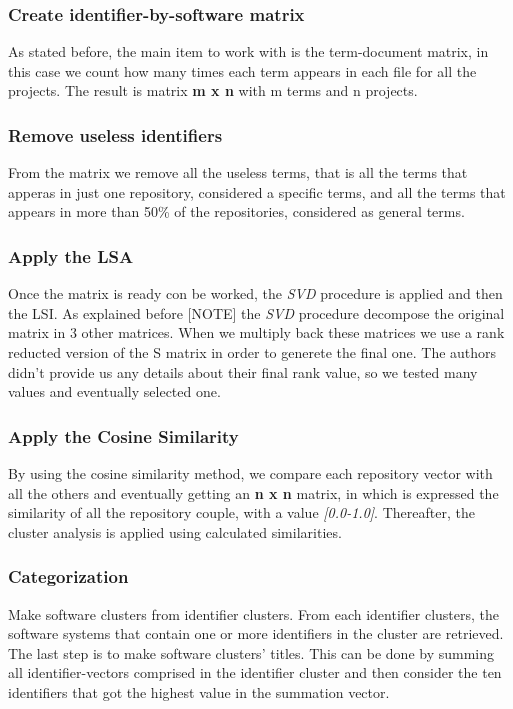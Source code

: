 \subsubsection{Create identifier-by-software matrix}
As stated before, the main item to work with is the term-document matrix, in this case we count how many times each term appears in each file for all the projects. The result is matrix \textbf{m x n} with m terms and n projects.

\subsubsection{Remove useless identifiers}
From the matrix we remove all the useless terms, that is all the terms that apperas in just one repository, considered a specific terms, and all the terms that appears in more than 50\% of the repositories, considered as general terms.

\subsubsection{Apply the LSA}
Once the matrix is ready con be worked, the \emph{SVD} procedure is applied and then the LSI. As explained before [NOTE] the \emph{SVD} procedure decompose the original matrix in 3 other matrices. When we multiply back these matrices we use a rank reducted version of the S matrix in order to generete the final one. The authors didn't provide us any details about their final rank value, so we tested many values and eventually selected one.

\subsubsection{Apply the Cosine Similarity}
By using the cosine similarity method, we compare each repository vector with all the others and eventually getting an \textbf{n x n} matrix, in which is expressed the similarity of all the repository couple, with a value \emph{[0.0-1.0]}. Thereafter, the cluster analysis is applied using calculated similarities. 

\subsubsection{Categorization}
Make software clusters from identifier clusters. From each identifier clusters, the software systems that contain one or more identifiers in the cluster are retrieved. The last step is to make software clusters’ titles. This can be done by summing all identifier-vectors comprised in the identifier cluster and then consider the ten identifiers that got the highest value in the summation vector.

